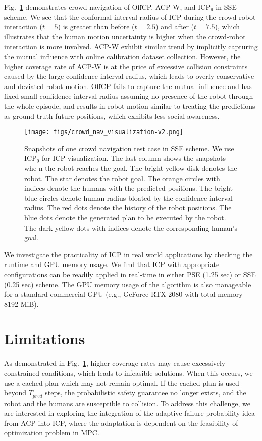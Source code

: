 Fig.~\ref{fig-snapshot} demonstrates crowd navigation of OffCP, ACP-W, and ICP$_9$ in SSE scheme. We see that the conformal interval radius of ICP during the crowd-robot interaction ($t = 5$) is greater than before ($t = 2.5$) and after ($t= 7.5$), which illustrates that the human motion uncertainty is higher when the crowd-robot interaction is more involved. ACP-W exhibit similar trend by implicitly capturing the mutual influence with online calibration dataset collection. However, the higher coverage rate of ACP-W is at the price of excessive collision constraints caused by the large confidence interval radius, which leads to overly conservative and deviated robot motion. OffCP fails to capture the mutual influence and has fixed small confidence interval radius assuming no presence of the robot through the whole episode, and results in robot motion similar to treating the predictions as ground truth future positions, which exhibits less social awareness.

\begin{figure}[hbt!]
\texttt{[image: figs/crowd\_nav\_visualization-v2.png]}
\caption{Snapshots of one crowd navigation test case in SSE scheme. We use ICP$_9$ for ICP visualization. The last column shows the snapshots whe n the robot reaches the goal. The bright yellow disk denotes the robot. The star denotes the robot goal. The orange circles with indices denote the humans with the predicted positions. The bright blue circles denote human radius bloated by the confidence interval radius. The red dots denote the history of the robot positions. The blue dots denote the generated plan to be executed by the robot. The dark yellow dots with indices denote the corresponding human's goal.} \label{fig-snapshot}
\end{figure}

We investigate the practicality of ICP in real world applications by checking the runtime and GPU memory usage. We find that ICP with appropriate configurations can be readily applied in real-time in either PSE (1.25 sec) or SSE (0.25 sec) scheme. The GPU memory usage of the algorithm is also manageable for a standard commercial GPU (e.g., GeForce RTX 2080 with total memory  8192 MiB).


\section{Limitations}\label{sec-limitations}
As demonstrated in Fig.~\ref{fig-snapshot}, higher coverage rates may cause excessively constrained conditions, which leads to infeasible solutions. When this occurs, we use a cached plan which may not remain optimal. If the cached plan is used beyond $T_{pred}$ steps, the probabilistic safety guarantee no longer exists, and the robot and the humans are susceptible to collision. To address this challenge, we are interested in exploring the integration of the adaptive failure probability idea from ACP into ICP, where the adaptation is dependent on the feasibility of optimization problem in MPC.

